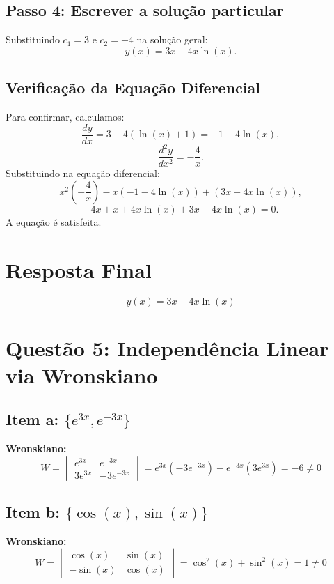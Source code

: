\documentclass[12pt,a4paper]{article}
\begin{document}
\subsection*{Passo 4: Escrever a solução particular}
Substituindo \( c_1 = 3 \) e \( c_2 = -4 \) na solução geral:
\[
y(x) = 3x - 4x \ln(x).
\]

\subsection*{Verificação da Equação Diferencial}
Para confirmar, calculamos:
\[
\frac{dy}{dx} = 3 - 4(\ln(x) + 1) = -1 - 4\ln(x),
\]
\[
\frac{d^2y}{dx^2} = -\frac{4}{x}.
\]
Substituindo na equação diferencial:
\[
x^2 \left( -\frac{4}{x} \right) - x(-1 - 4\ln(x)) + (3x - 4x \ln(x)),
\]
\[
-4x + x + 4x \ln(x) + 3x - 4x \ln(x) = 0.
\]
A equação é satisfeita.

\section*{Resposta Final}
\[
\boxed{y(x) = 3x - 4x \ln(x)}
\]



\section*{Questão 5: Independência Linear via Wronskiano}

\subsection*{Item a: \(\{e^{3x}, e^{-3x}\}\)}

\textbf{Wronskiano:}
\[
W = \begin{vmatrix}
e^{3x} & e^{-3x} \\
3e^{3x} & -3e^{-3x}
\end{vmatrix} = e^{3x}(-3e^{-3x}) - e^{-3x}(3e^{3x}) = -6 \neq 0
\]

\subsection*{Item b: \(\{\cos(x), \sin(x)\}\)}

\textbf{Wronskiano:}
\[
W = \begin{vmatrix}
\cos(x) & \sin(x) \\
-\sin(x) & \cos(x)
\end{vmatrix} = \cos^2(x) + \sin^2(x) = 1 \neq 0
\]
\end{document}
